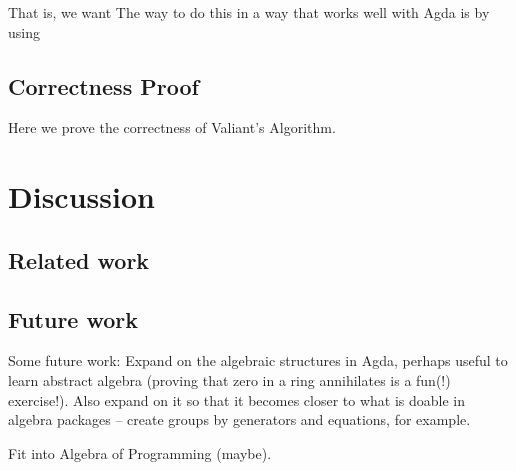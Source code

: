 \documentclass{article}
\begin{document}
That is, we want 
The way to do this in a way that works well with Agda is by using 



\subsection{Correctness Proof}
Here we prove the correctness of Valiant's Algorithm.
\section{Discussion}
\subsection{Related work}
\subsection{Future work}
Some future work:
Expand on the algebraic structures in Agda, perhaps useful to learn abstract algebra (proving that zero in a ring annihilates is a fun(!) exercise!). Also expand on it so that it becomes closer to what is doable in algebra packages -- create groups by generators and equations, for example.

Fit into Algebra of Programming (maybe).

\listoftodos


\end{document}
